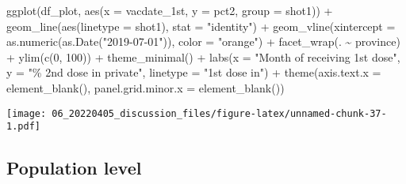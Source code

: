 \documentclass[
]{article}
\newenvironment{Shaded}{\begin{snugshade}}{\end{snugshade}}
\newcommand{\AttributeTok}[1]{\textcolor[rgb]{0.77,0.63,0.00}{#1}}
\newcommand{\DecValTok}[1]{\textcolor[rgb]{0.00,0.00,0.81}{#1}}
\newcommand{\FunctionTok}[1]{\textcolor[rgb]{0.00,0.00,0.00}{#1}}
\newcommand{\NormalTok}[1]{#1}
\newcommand{\SpecialCharTok}[1]{\textcolor[rgb]{0.00,0.00,0.00}{#1}}
\newcommand{\StringTok}[1]{\textcolor[rgb]{0.31,0.60,0.02}{#1}}
\begin{document}
\begin{Shaded}
\begin{Highlighting}[]
\FunctionTok{ggplot}\NormalTok{(df\_plot, }\FunctionTok{aes}\NormalTok{(}\AttributeTok{x =}\NormalTok{ vacdate\_1st, }\AttributeTok{y =}\NormalTok{ pct2, }\AttributeTok{group =}\NormalTok{ shot1)) }\SpecialCharTok{+}
    \FunctionTok{geom\_line}\NormalTok{(}\FunctionTok{aes}\NormalTok{(}\AttributeTok{linetype =}\NormalTok{ shot1), }\AttributeTok{stat =} \StringTok{"identity"}\NormalTok{) }\SpecialCharTok{+} \FunctionTok{geom\_vline}\NormalTok{(}\AttributeTok{xintercept =} \FunctionTok{as.numeric}\NormalTok{(}\FunctionTok{as.Date}\NormalTok{(}\StringTok{"2019{-}07{-}01"}\NormalTok{)),}
    \AttributeTok{color =} \StringTok{"orange"}\NormalTok{) }\SpecialCharTok{+} \FunctionTok{facet\_wrap}\NormalTok{(. }\SpecialCharTok{\textasciitilde{}}\NormalTok{ province) }\SpecialCharTok{+} \FunctionTok{ylim}\NormalTok{(}\FunctionTok{c}\NormalTok{(}\DecValTok{0}\NormalTok{,}
    \DecValTok{100}\NormalTok{)) }\SpecialCharTok{+} \FunctionTok{theme\_minimal}\NormalTok{() }\SpecialCharTok{+} \FunctionTok{labs}\NormalTok{(}\AttributeTok{x =} \StringTok{"Month of receiving 1st dose"}\NormalTok{,}
    \AttributeTok{y =} \StringTok{"\% 2nd dose in private"}\NormalTok{, }\AttributeTok{linetype =} \StringTok{"1st dose in"}\NormalTok{) }\SpecialCharTok{+}
    \FunctionTok{theme}\NormalTok{(}\AttributeTok{axis.text.x =} \FunctionTok{element\_blank}\NormalTok{(), }\AttributeTok{panel.grid.minor.x =} \FunctionTok{element\_blank}\NormalTok{())}
\end{Highlighting}
\end{Shaded}

\texttt{[image: 06\_20220405\_discussion\_files/figure-latex/unnamed-chunk-37-1.pdf]}

\hypertarget{population-level}{%
\subsection{Population level}\label{population-level}}
\end{document}
